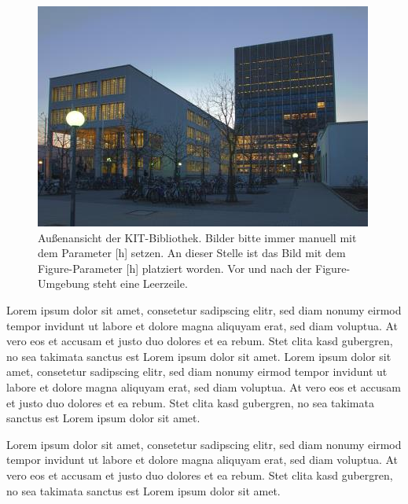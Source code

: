 \begin{figure}[h] %
	\centering
	\includegraphics[width=\textwidth]{Abbildungen/bib.jpg}
	\caption{Außenansicht der KIT-Bibliothek. Bilder bitte immer manuell mit dem Parameter [h] setzen.	An dieser Stelle ist das Bild mit dem Figure-Parameter [h] platziert worden. Vor und nach der Figure-Umgebung steht eine Leerzeile.}
	\label{fig:bib}
\end{figure}

Lorem ipsum dolor sit amet, consetetur sadipscing elitr, sed diam nonumy eirmod tempor invidunt ut labore et dolore magna aliquyam erat, sed diam voluptua. At vero eos et accusam et justo duo dolores et ea rebum. Stet clita kasd gubergren, no sea takimata sanctus est Lorem ipsum dolor sit amet. Lorem ipsum dolor sit amet, consetetur sadipscing elitr, sed diam nonumy eirmod tempor invidunt ut labore et dolore magna aliquyam erat, sed diam voluptua. At vero eos et accusam et justo duo dolores et ea rebum. Stet clita kasd gubergren, no sea takimata sanctus est Lorem ipsum dolor sit amet.

Lorem ipsum dolor sit amet, consetetur sadipscing elitr, sed diam nonumy eirmod tempor invidunt ut labore et dolore magna aliquyam erat, sed diam voluptua. At vero eos et accusam et justo duo dolores et ea rebum. Stet clita kasd gubergren, no sea takimata sanctus est Lorem ipsum dolor sit amet. 	

